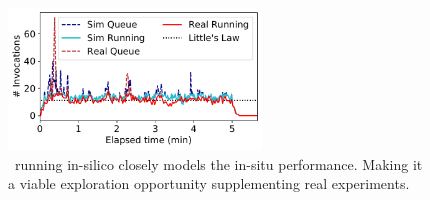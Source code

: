 \begin{figure}
  \centering
  \includegraphics[width=0.6\textwidth]{iluvatar/graphs/trace-compare/baseline/minheap_ed/16/paper-status.pdf}
  \caption{\sysname~running in-silico closely models the in-situ performance. Making it a viable exploration opportunity supplementing real experiments.}
  \label{fig:sim-vs-live-little}
\end{figure}

